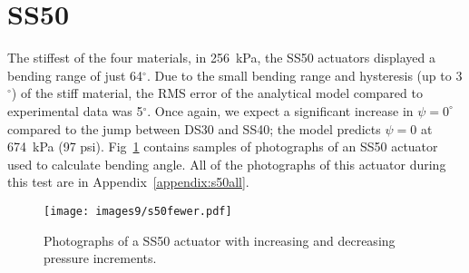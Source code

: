 \clearpage
\section{SS50}

The stiffest of the four materials, in 256~kPa, the SS50 actuators displayed a bending range of just 64$^\circ$. Due to the small bending range and hysteresis (up to 3$^\circ$) of the stiff material, the RMS error of the analytical model compared to experimental data was 5$^\circ$. Once again, we expect a significant increase in $\psi=0^\circ$ compared to the jump between DS30 and SS40; the model predicts $\psi=0$ at 674~kPa (97 psi). Fig~\ref{fig:s50fewer} contains samples of photographs of an SS50 actuator used to calculate bending angle. All of the photographs of this actuator during this test are in Appendix~\ref{appendix:s50all}. 
\\
\begin{figure}[ht]
    \centering
     \texttt{[image: images9/s50fewer.pdf]}
    \caption{Photographs of a SS50 actuator with increasing and decreasing pressure increments.}
    \label{fig:s50fewer}
\end{figure}
